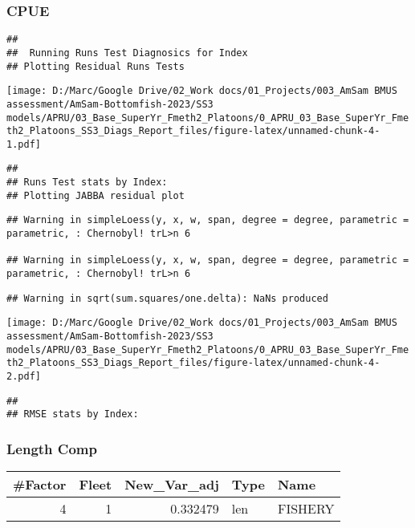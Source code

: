 \documentclass[
]{article}
\begin{document}
\hypertarget{cpue}{%
\subsubsection{CPUE}\label{cpue}}

\begin{verbatim}
## 
##  Running Runs Test Diagnosics for Index 
## Plotting Residual Runs Tests
\end{verbatim}

\texttt{[image: D:/Marc/Google Drive/02\_Work docs/01\_Projects/003\_AmSam BMUS assessment/AmSam-Bottomfish-2023/SS3 models/APRU/03\_Base\_SuperYr\_Fmeth2\_Platoons/0\_APRU\_03\_Base\_SuperYr\_Fmeth2\_Platoons\_SS3\_Diags\_Report\_files/figure-latex/unnamed-chunk-4-1.pdf]}

\begin{verbatim}
## 
## Runs Test stats by Index:
## Plotting JABBA residual plot
\end{verbatim}

\begin{verbatim}
## Warning in simpleLoess(y, x, w, span, degree = degree, parametric = parametric, : Chernobyl! trL>n 6

## Warning in simpleLoess(y, x, w, span, degree = degree, parametric = parametric, : Chernobyl! trL>n 6
\end{verbatim}

\begin{verbatim}
## Warning in sqrt(sum.squares/one.delta): NaNs produced
\end{verbatim}

\texttt{[image: D:/Marc/Google Drive/02\_Work docs/01\_Projects/003\_AmSam BMUS assessment/AmSam-Bottomfish-2023/SS3 models/APRU/03\_Base\_SuperYr\_Fmeth2\_Platoons/0\_APRU\_03\_Base\_SuperYr\_Fmeth2\_Platoons\_SS3\_Diags\_Report\_files/figure-latex/unnamed-chunk-4-2.pdf]}

\begin{verbatim}
## 
## RMSE stats by Index:
\end{verbatim}

\hypertarget{length-comp}{%
\subsubsection{Length Comp}\label{length-comp}}

\captionsetup[table]{labelformat=empty,skip=1pt}
\begin{longtable}{rrrll}
\toprule
\#Factor & Fleet & New\_Var\_adj & Type & Name \\ 
\midrule
4 & 1 & 0.332479 & len & FISHERY \\ 
\bottomrule
\end{longtable}
\end{document}

